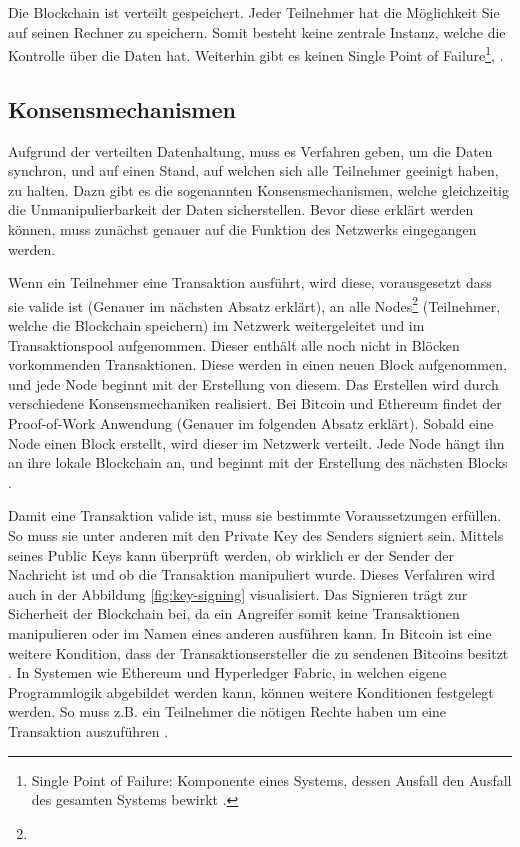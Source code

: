 Die Blockchain ist verteilt gespeichert. Jeder Teilnehmer hat die Möglichkeit Sie auf seinen Rechner zu speichern. Somit besteht keine zentrale Instanz, welche die Kontrolle über die Daten hat. Weiterhin gibt es keinen Single Point of Failure\footnote{Single Point of Failure: Komponente eines Systems, dessen Ausfall den Ausfall des gesamten Systems bewirkt \cite{SinglePointFailure2016}.},  \cite{CrosbyBlockChainTechnologyBitcoin2016}.

\label{subsec:konsens}
\subsection{Konsensmechanismen}

Aufgrund der verteilten Datenhaltung, muss es Verfahren geben, um die Daten synchron, und auf einen Stand, auf welchen sich alle Teilnehmer geeinigt haben, zu halten. Dazu gibt es die sogenannten Konsensmechanismen, welche gleichzeitig die Unmanipulierbarkeit der Daten sicherstellen. Bevor diese erklärt werden können, muss zunächst genauer auf die Funktion des Netzwerks eingegangen werden.

Wenn ein Teilnehmer eine Transaktion ausführt, wird diese, vorausgesetzt dass sie valide ist (Genauer im nächsten Absatz erklärt), an alle Nodes\footnote{} (Teilnehmer, welche die Blockchain speichern) im Netzwerk weitergeleitet und im Transaktionspool aufgenommen. Dieser enthält alle noch nicht in Blöcken vorkommenden Transaktionen. Diese werden in einen neuen Block aufgenommen, und jede Node beginnt mit der Erstellung von diesem. Das Erstellen wird durch verschiedene Konsensmechaniken realisiert. Bei Bitcoin und Ethereum findet der Proof-of-Work Anwendung (Genauer im folgenden Absatz erklärt). Sobald eine Node einen Block erstellt, wird dieser im Netzwerk verteilt. Jede Node hängt ihn an ihre lokale Blockchain an, und beginnt mit der Erstellung des nächsten Blocks \cite{MAntonopoulosMasteringbitcoin2015}.

Damit eine Transaktion valide ist, muss sie bestimmte Voraussetzungen erfüllen. So muss sie unter anderen mit den Private Key des Senders signiert sein. Mittels seines Public Keys kann überprüft werden, ob wirklich er der Sender der Nachricht ist und ob die Transaktion manipuliert wurde. Dieses Verfahren wird auch in der Abbildung \ref{fig:key-signing} visualisiert. Das Signieren trägt zur Sicherheit der Blockchain bei, da ein Angreifer somit keine Transaktionen manipulieren oder im Namen eines anderen ausführen kann. In Bitcoin ist eine weitere Kondition, dass der Transaktionsersteller die zu sendenen Bitcoins besitzt \cite{AntonopoulosMasteringbitcoin2015}. In Systemen wie Ethereum und Hyperledger Fabric, in welchen eigene Programmlogik abgebildet werden kann, können weitere Konditionen festgelegt werden. So muss z.B. ein Teilnehmer die nötigen Rechte haben um eine Transaktion auszuführen \cite{AccessControlLanguage}.

